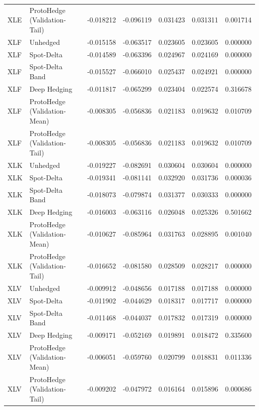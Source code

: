 \begin{tabular}{llrrrrr}
XLE & ProtoHedge (Validation-Tail) & -0.018212 & -0.096119 & 0.031423 & 0.031311 & 0.001714 \\
XLF & Unhedged & -0.015158 & -0.063517 & 0.023605 & 0.023605 & 0.000000 \\
XLF & Spot-Delta & -0.014589 & -0.063396 & 0.024967 & 0.024169 & 0.000000 \\
XLF & Spot-Delta Band & -0.015527 & -0.066010 & 0.025437 & 0.024921 & 0.000000 \\
XLF & Deep Hedging & -0.011817 & -0.065299 & 0.023404 & 0.022574 & 0.316678 \\
XLF & ProtoHedge (Validation-Mean) & -0.008305 & -0.056836 & 0.021183 & 0.019632 & 0.010709 \\
XLF & ProtoHedge (Validation-Tail) & -0.008305 & -0.056836 & 0.021183 & 0.019632 & 0.010709 \\
XLK & Unhedged & -0.019227 & -0.082691 & 0.030604 & 0.030604 & 0.000000 \\
XLK & Spot-Delta & -0.019341 & -0.081141 & 0.032920 & 0.031736 & 0.000036 \\
XLK & Spot-Delta Band & -0.018073 & -0.079874 & 0.031377 & 0.030333 & 0.000000 \\
XLK & Deep Hedging & -0.016003 & -0.063116 & 0.026048 & 0.025326 & 0.501662 \\
XLK & ProtoHedge (Validation-Mean) & -0.010627 & -0.085964 & 0.031763 & 0.028895 & 0.001040 \\
XLK & ProtoHedge (Validation-Tail) & -0.016652 & -0.081580 & 0.028509 & 0.028217 & 0.000000 \\
XLV & Unhedged & -0.009912 & -0.048656 & 0.017188 & 0.017188 & 0.000000 \\
XLV & Spot-Delta & -0.011902 & -0.044629 & 0.018317 & 0.017717 & 0.000000 \\
XLV & Spot-Delta Band & -0.011468 & -0.044037 & 0.017832 & 0.017319 & 0.000000 \\
XLV & Deep Hedging & -0.009171 & -0.052169 & 0.019891 & 0.018472 & 0.335600 \\
XLV & ProtoHedge (Validation-Mean) & -0.006051 & -0.059760 & 0.020799 & 0.018831 & 0.011336 \\
XLV & ProtoHedge (Validation-Tail) & -0.009202 & -0.047972 & 0.016164 & 0.015896 & 0.000686 \\
\bottomrule
\end{tabular}
